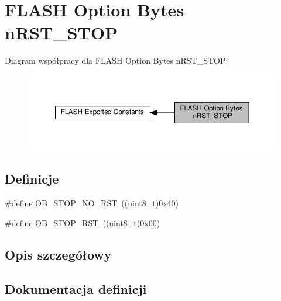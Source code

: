 \hypertarget{group___f_l_a_s_h_ex___option___bytes__n_r_s_t___s_t_o_p}{}\section{F\+L\+A\+SH Option Bytes n\+R\+S\+T\+\_\+\+S\+T\+OP}
\label{group___f_l_a_s_h_ex___option___bytes__n_r_s_t___s_t_o_p}
Diagram współpracy dla F\+L\+A\+SH Option Bytes n\+R\+S\+T\+\_\+\+S\+T\+OP\+:\nopagebreak
\begin{figure}[H]
\begin{center}
\leavevmode
\includegraphics[width=350pt]{group___f_l_a_s_h_ex___option___bytes__n_r_s_t___s_t_o_p}
\end{center}
\end{figure}
\subsection*{Definicje}
\begin{DoxyCompactItemize}
\item 
\#define \hyperlink{group___f_l_a_s_h_ex___option___bytes__n_r_s_t___s_t_o_p_ga7344fe0ec25c5eb2d11db7c855325436}{O\+B\+\_\+\+S\+T\+O\+P\+\_\+\+N\+O\+\_\+\+R\+ST}~((uint8\+\_\+t)0x40)
\item 
\#define \hyperlink{group___f_l_a_s_h_ex___option___bytes__n_r_s_t___s_t_o_p_gaef92c03b1f279c532bfa13d3bb074b57}{O\+B\+\_\+\+S\+T\+O\+P\+\_\+\+R\+ST}~((uint8\+\_\+t)0x00)
\end{DoxyCompactItemize}


\subsection{Opis szczegółowy}


\subsection{Dokumentacja definicji}
\mbox{\label{group___f_l_a_s_h_ex___option___bytes__n_r_s_t___s_t_o_p_ga7344fe0ec25c5eb2d11db7c855325436}} 

